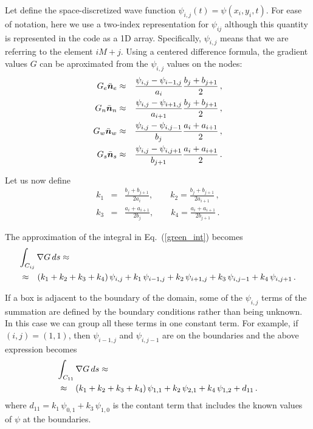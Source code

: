 \documentclass[a4paper,11pt]{article}
\newcommand{\ve}[1]{\mbox{\boldmath $ #1$}}
\begin{document}
Let define the space-discretized wave function $\psi_{i,j}(t) = \psi(x_i, y_i, t)$.
For ease of notation, here we use a two-index representation for $\psi_{ij}$ although this quantity is
represented in the code as a 1D array.  Specifically, $\psi_{i,j}$ means that we are referring to the element ${iM+j}$.
Using a centered difference formula, the gradient values $G$ can be aproximated from the $\psi_{i,j}$ values on the nodes: 
\begin{eqnarray}
G_e \bar{\ve n}_e & \approx & \frac{\psi_{i,j}-\psi_{i-1,j}}{a_i} \frac{b_j+b_{j+1}}{2} \, ,      \\ \nonumber
G_n \bar{\ve n}_n & \approx & \frac{\psi_{i,j}-\psi_{i+1,j}}{a_{i+1}} \frac{b_j+b_{j+1}}{2} \, ,  \\ \nonumber
G_w \bar{\ve n}_w & \approx & \frac{\psi_{i,j}-\psi_{i,j-1}}{b_j} \frac{a_i+a_{i+1}}{2} \, ,      \\ \nonumber
G_s \bar{\ve n}_s & \approx & \frac{\psi_{i,j}-\psi_{i,j+1}}{b_{j+1}} \frac{a_i+a_{i+1}}{2} \, .     \nonumber
\end{eqnarray}

Let us now define
\begin{eqnarray}
k_1 &=& \frac{b_j+b_{j+1}}{2a_i}, \qquad k_2 = \frac{b_j+b_{j+1}}{2a_{i+1}}  \, ,      \\ \nonumber
k_3 &=& \frac{a_i+a_{i+1}}{2b_j}, \qquad k_4 = \frac{a_i+a_{i+1}}{2b_{j+1}}  \, .     \nonumber
\end{eqnarray}

The approximation of the integral in Eq.~(\ref{green_int}) becomes
\begin{eqnarray}
\lefteqn{\int_{C_{ij}} \nabla G \, ds \approx}   \\ \nonumber
& \approx &   (k_1+k_2+k_3+k_4) \, \psi_{i, j} + 
k_1 \, \psi_{i-1,j} + k_2 \, \psi_{i+1,j} + k_3 \, \psi_{i,j-1} + k_4 \, \psi_{i,j+1} \, .
\end{eqnarray}

If a box is adjacent to the boundary of the domain, some of the $\psi_{i,j}$ terms of the summation are defined by the boundary conditions rather than being unknown.  In this case we can group all these terms in one constant term.
For example, if $(i, j) = (1, 1)$, then $\psi_{i-1,j}$ and $\psi_{i,j-1}$ are on the boundaries and the above expression becomes
\begin{eqnarray}
\lefteqn{\int_{C_{11}} \nabla G \, ds \approx}   \\ \nonumber
& \approx &   (k_1+k_2+k_3+k_4) \, \psi_{1,1} + 
k_2 \, \psi_{2,1} + k_4 \, \psi_{1,2} + d_{11} \, .
\end{eqnarray}
where $d_{11} = k_1 \, \psi_{0,1} + k_3 \, \psi_{1,0}$ is the contant term that includes the known
values of $\psi$ at the boundaries.
\end{document}
